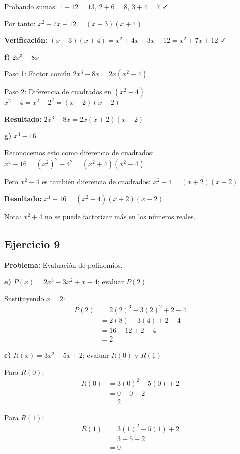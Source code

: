 Probando sumas: $1 + 12 = 13$, $2 + 6 = 8$, $3 + 4 = 7$ ✓

Por tanto: $x^2 + 7x + 12 = (x + 3)(x + 4)$

\textbf{Verificación:} $(x + 3)(x + 4) = x^2 + 4x + 3x + 12 = x^2 + 7x + 12$ ✓

\textbf{f)} $2x^3 - 8x$

Paso 1: Factor común
$2x^3 - 8x = 2x(x^2 - 4)$

Paso 2: Diferencia de cuadrados en $(x^2 - 4)$
$x^2 - 4 = x^2 - 2^2 = (x + 2)(x - 2)$

\textbf{Resultado:} $2x^3 - 8x = 2x(x + 2)(x - 2)$

\textbf{g)} $x^4 - 16$

Reconocemos esto como diferencia de cuadrados:
$x^4 - 16 = (x^2)^2 - 4^2 = (x^2 + 4)(x^2 - 4)$

Pero $x^2 - 4$ es también diferencia de cuadrados:
$x^2 - 4 = (x + 2)(x - 2)$

\textbf{Resultado:} $x^4 - 16 = (x^2 + 4)(x + 2)(x - 2)$

Nota: $x^2 + 4$ no se puede factorizar más en los números reales.

\subsection*{Ejercicio 9}

\textbf{Problema:} Evaluación de polinomios.

\textbf{a)} $P(x) = 2x^3 - 3x^2 + x - 4$; evaluar $P(2)$

Sustituyendo $x = 2$:
\begin{align}
P(2) &= 2(2)^3 - 3(2)^2 + 2 - 4\\
&= 2(8) - 3(4) + 2 - 4\\
&= 16 - 12 + 2 - 4\\
&= 2
\end{align}

\textbf{c)} $R(x) = 3x^2 - 5x + 2$; evaluar $R(0)$ y $R(1)$

Para $R(0)$:
\begin{align}
R(0) &= 3(0)^2 - 5(0) + 2\\
&= 0 - 0 + 2\\
&= 2
\end{align}

Para $R(1)$:
\begin{align}
R(1) &= 3(1)^2 - 5(1) + 2\\
&= 3 - 5 + 2\\
&= 0
\end{align}

